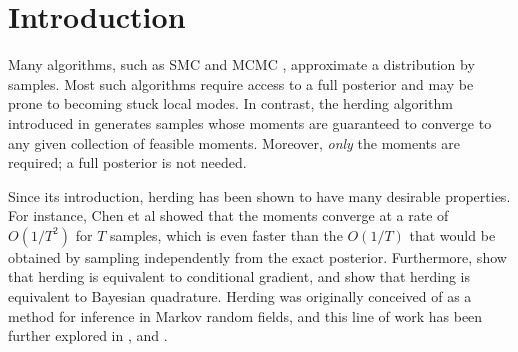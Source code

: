 \documentclass[paper.tex]{subfiles}
\begin{document}
\section{Introduction} 
\label{sec:intro}

Many algorithms, such as SMC \citep{smc} and MCMC \citep{mcmc}, approximate a 
distribution by samples. Most such algorithms require access to a full posterior and 
may be prone to becoming stuck local modes. In contrast, the herding algorithm introduced in 
\citet{Welling:2009a} generates samples whose moments are guaranteed to converge 
to any given collection of feasible moments. Moreover, \emph{only} the moments 
are required; a full posterior is not needed.

Since its introduction, herding has been shown to have many desirable properties.
For instance, Chen et al showed that the moments converge at a rate of $O(1/T^{2})$ for 
$T$ samples, which is even faster than the $O(1/T)$ that would be obtained 
by sampling independently from the exact posterior. Furthermore, \citet{Bach:2012a} show that herding is 
equivalent to conditional gradient, and \citet{Huszar:2012} show that 
herding is equivalent to Bayesian quadrature. Herding was originally conceived of as a method 
for inference in Markov random fields, and this line of work has been further explored in 
\citet{Welling:2009a}, \citet{Gelfand:2010} and \citet{Bornn:2013}.
\end{document}
